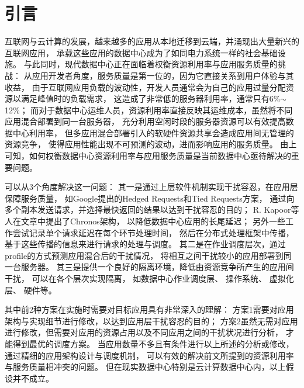 

\chapter{引言}
\label{chap:intro}

互联网与云计算的发展，越来越多的应用从本地迁移到云端，并涌现出大量新兴的互联网应用，
承载这些应用的数据中心成为了如同电力系统一样的社会基础设施。
与此同时，现代数据中心正在面临着权衡资源利用率与应用服务质量的挑战：
从应用开发者角度，服务质量是第一位的，因为它直接关系到用户体验与其收益，
由于互联网应用负载的波动性，开发人员通常会为自己的应用过量分配资源以满足峰值时的负载需求，
这造成了非常低的服务器利用率，通常只有6\%$\sim$12\%；
而对于数据中心运维人员，资源利用率直接反映其运维成本，虽然将不同应用混合部署到同一台服务器，
充分利用空闲时段的服务器资源可以有效提高数据中心利用率，
但多应用混合部署引入的软硬件资源共享会造成应用间无管理的资源竞争，
使得应用性能出现不可预测的波动，进而影响应用的服务质量。
由上可知，如何权衡数据中心资源利用率与应用服务质量是当前数据中心亟待解决的重要问题。

可以从3个角度解决这一问题：
其一是通过上层软件机制实现干扰容忍，在应用层保障服务质量，
如Google提出的Hedged Requests和Tied Requests方案\cite{dean_tail_2013}，
通过向多个副本发送请求，并选择最快返回的结果以达到干扰容忍的目的；
R. Kapoor等人在文章\cite{Kapoor:2012:Chronos}中提出了Chronos架构，
以降低数据中心应用的长尾延迟；
另外一些工作\cite{timecard:2013, d2p:2014}尝试记录单个请求延迟在每个环节处理时间，
然后在分布式处理框架中传播，基于这些传播的信息来进行请求的处理与调度。
其二是在作业调度层次，通过profile的方式预测应用混合后的干扰情况，
将相互之间干扰较小的应用部署到同一台服务器\cite{mars_bubble-up:_2011, kambadur_measuring_2012}。
其三是提供一个良好的隔离环境，降低由资源竞争所产生的应用间干扰，
可以在各个层次实现隔离，
如数据中心作业调度层\cite{Hindman:2011:Mesos, Schwarzkopf_omega_2013, borg:2015}、
操作系统\cite{cgroup, lin_gaining_2008, tam_managing_2007, liu_software_2012, Liu:2014:ISCA}、
虚拟化层\cite{Xu:2013:Bobtail:, Xu:2013:SMALL}、
硬件\cite{kasture_ubik:_2014, sanchez_vantage:_2011, sanchez_zcache:_2010, qureshi_utility-based_2006, muralidhara_reducing_2011}等。


其中前2种方案在实施时需要对目标应用具有非常深入的理解：
方案1需要对应用架构与实现细节进行修改，以达到应用层干扰容忍的目的；
方案2虽然无需对应用进行修改，但需要对应用的资源占用以及不同应用之间的干扰状况进行分析，
才能得到最优的调度方案。
当应用数量不多且有条件进行以上所述的分析或修改，通过精细的应用架构设计与调度机制，
可以有效的解决前文所提到的资源利用率与服务质量相冲突的问题。
但在现实数据中心特别是云计算数据中心内，以上假设并不成立。

